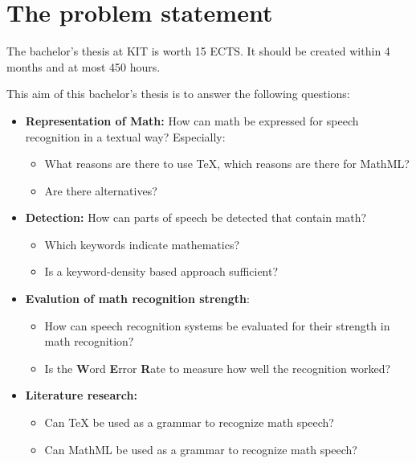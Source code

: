 \documentclass[a4paper]{scrartcl}
\begin{document}
\section{The problem statement}
    The bachelor's thesis at KIT is worth 15 ECTS. It should be 
    created within 4 months and at most 450 hours.

    This aim of this bachelor's thesis is to answer the following 
    questions:
    \begin{itemize}
        \item \textbf{Representation of Math:} How can math be expressed 
              for speech recognition in a textual way?
              Especially: 
            \begin{itemize}
                \item What reasons are there to use \TeX{}, which
              reasons are there for MathML? 
                \item Are there alternatives?
            \end{itemize}
        \item \textbf{Detection:} How can parts of speech be detected
              that contain math?
            \begin{itemize}
                \item Which keywords indicate mathematics?
                \item Is a keyword-density based approach sufficient?
            \end{itemize}
        \item \textbf{Evalution of math recognition strength}: 
            \begin{itemize}
                \item How can speech recognition systems be evaluated 
                      for their strength in math recognition?
                \item Is the \textbf{W}ord \textbf{E}rror \textbf{R}ate
                      to measure how well the recognition worked?
            \end{itemize}
        \item \textbf{Literature research:}
            \begin{itemize}
                \item Can \TeX{} be used as a grammar to recognize math speech?
                \item Can MathML be used as a grammar to recognize math speech?
            \end{itemize}
    \end{itemize}
\end{document}
